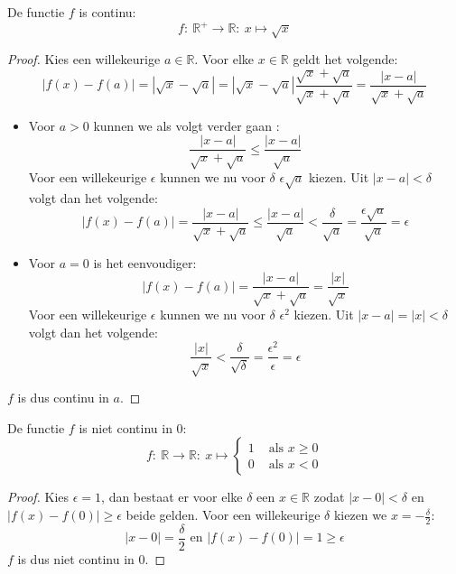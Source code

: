 \documentclass[main.tex]{subfiles}
\begin{document}
\begin{vb}
  De functie $f$ is continu:
  \[ f:\ \mathbb{R}^{+} \rightarrow \mathbb{R}:\ x \mapsto \sqrt{x} \]

  \begin{proof}
    Kies een willekeurige $a \in \mathbb{R}$.
    Voor elke $x \in \mathbb{R}$ geldt het volgende:
    \[ |f(x)-f(a)| = |\sqrt{x}-\sqrt{a}| = \left|\sqrt{x}-\sqrt{a}\right|\frac{\sqrt{x}+\sqrt{a}}{\sqrt{x}+\sqrt{a}} = \frac{|x-a|}{\sqrt{x}+\sqrt{a}} \]
    \begin{itemize}
    \item Voor $a>0$ kunnen we als volgt verder gaan :
      \[ \frac{|x-a|}{\sqrt{x}+\sqrt{a}} \le \frac{|x-a|}{\sqrt{a}} \]
      Voor een willekeurige $\epsilon$ kunnen we nu voor $\delta$ $\epsilon\sqrt{a}$ kiezen.
      Uit $|x-a|< \delta$ volgt dan het volgende:
      \[ |f(x)-f(a)| = \frac{|x-a|}{\sqrt{x}+\sqrt{a}} \le \frac{|x-a|}{\sqrt{a}} < \frac{\delta}{\sqrt{a}} = \frac{\epsilon\sqrt{a}}{\sqrt{a}} = \epsilon \]
    \item Voor $a=0$ is het eenvoudiger:
      \[ |f(x)-f(a)| =  \frac{|x-a|}{\sqrt{x}+\sqrt{a}} = \frac{|x|}{\sqrt{x}} \]
      Voor een willekeurige $\epsilon$ kunnen we nu voor $\delta$ $\epsilon^{2}$ kiezen. 
      Uit $|x-a|=|x|< \delta$ volgt dan het volgende:
      \[ \frac{|x|}{\sqrt{x}} < \frac{\delta}{\sqrt{\delta}} = \frac{\epsilon^{2}}{\epsilon} = \epsilon \]
    \end{itemize}
    $f$ is dus continu in $a$.
  \end{proof}
\end{vb}


\begin{tvb}
  De functie $f$ is niet continu in $0$:
  \[
  f:\ \mathbb{R} \rightarrow \mathbb{R}:\ x\mapsto 
  \left\{
    \begin{array}{cl}
      1 & \text{ als } x \ge 0\\
      0 & \text{ als } x < 0
    \end{array}
  \right.
  \]

  \begin{proof}
    Kies $\epsilon = 1$, dan bestaat er voor elke $\delta$ een $x\in \mathbb{R}$ zodat $|x-0|<\delta$ en $|f(x)-f(0)|\ge \epsilon$ beide gelden.
    Voor een willekeurige $\delta$ kiezen we $x = -\frac{\delta}{2}$:
    \[ |x-0| = \frac{\delta}{2} \text{ en } |f(x)-f(0)| = 1 \ge \epsilon \]
    $f$ is dus niet continu in $0$.
  \end{proof}
\end{tvb}
\end{document}
